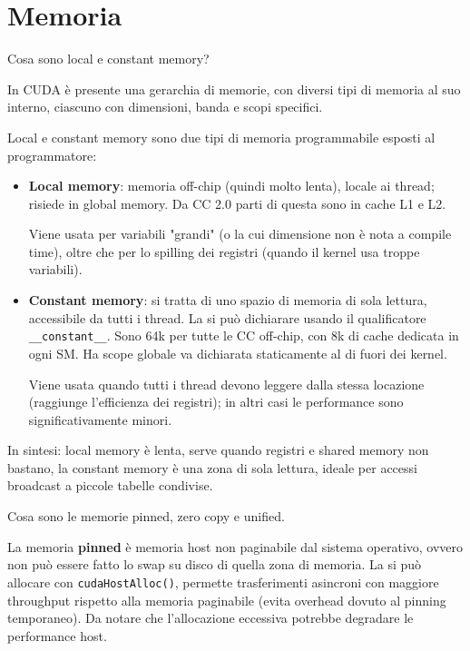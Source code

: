 \section{Memoria}

\begin{questions}
    \question Cosa sono local e constant memory?
    
    \begin{solution}
        In CUDA è presente una gerarchia di memorie, con diversi tipi di memoria al suo interno, ciascuno con dimensioni, banda e scopi specifici. 
        
        Local e constant memory sono due tipi di memoria programmabile esposti al programmatore: 
        \begin{itemize}
            \item \textbf{Local memory}: memoria off-chip (quindi molto lenta), locale ai thread; risiede in global memory. Da CC 2.0 parti di questa sono in cache L1 e L2.
            
            Viene usata per variabili "grandi" (o la cui dimensione non è nota a compile time), oltre che per lo spilling dei registri (quando il kernel usa troppe variabili).
            
            \item \textbf{Constant memory}: si tratta di uno spazio di memoria di sola lettura, accessibile da tutti i thread. La si può dichiarare usando il qualificatore \texttt{\_\_constant\_\_}. Sono 64k per tutte le CC off-chip, con 8k di cache dedicata in ogni SM. Ha scope globale va dichiarata staticamente al di fuori dei kernel.
            
            Viene usata quando tutti i thread devono leggere dalla stessa locazione (raggiunge l'efficienza dei registri); in altri casi le performance sono significativamente minori.
        \end{itemize}
        
        In sintesi: local memory è lenta, serve quando registri e shared memory non bastano, la constant memory è una zona di sola lettura, ideale per accessi broadcast a piccole tabelle condivise.
    \end{solution}
    
    \question Cosa sono le memorie pinned, zero copy e unified.
    
    \begin{solution}
        La memoria \textbf{pinned} è memoria host non paginabile dal sistema operativo, ovvero non può essere fatto lo swap su disco di quella zona di memoria. La si può allocare con \texttt{cudaHostAlloc()}, permette trasferimenti asincroni con maggiore throughput rispetto alla memoria paginabile (evita overhead dovuto al pinning temporaneo). Da notare che l'allocazione eccessiva potrebbe degradare le performance host.
        

\end{solution}
\end{questions}
